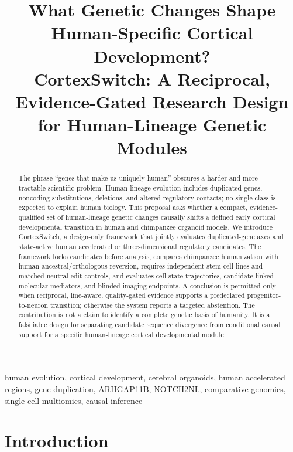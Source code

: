 \documentclass[conference]{IEEEtran}
\newcommand{\csw}{CortexSwitch}
\begin{document}
\title{What Genetic Changes Shape Human-Specific Cortical Development?\\
\csw: A Reciprocal, Evidence-Gated Research Design for Human-Lineage Genetic Modules}

\author{}
\maketitle

\begin{abstract}
The phrase ``genes that make us uniquely human'' obscures a harder and more tractable scientific problem. Human-lineage evolution includes duplicated genes, noncoding substitutions, deletions, and altered regulatory contacts; no single class is expected to explain human biology. This proposal asks whether a compact, evidence-qualified set of human-lineage genetic changes causally shifts a defined early cortical developmental transition in human and chimpanzee organoid models. We introduce CortexSwitch, a design-only framework that jointly evaluates duplicated-gene axes and state-active human accelerated or three-dimensional regulatory candidates. The framework locks candidates before analysis, compares chimpanzee humanization with human ancestral/orthologous reversion, requires independent stem-cell lines and matched neutral-edit controls, and evaluates cell-state trajectories, candidate-linked molecular mediators, and blinded imaging endpoints. A conclusion is permitted only when reciprocal, line-aware, quality-gated evidence supports a predeclared progenitor-to-neuron transition; otherwise the system reports a targeted abstention. The contribution is not a claim to identify a complete genetic basis of humanity. It is a falsifiable design for separating candidate sequence divergence from conditional causal support for a specific human-lineage cortical developmental module.
\end{abstract}

\begin{IEEEkeywords}
human evolution, cortical development, cerebral organoids, human accelerated regions, gene duplication, ARHGAP11B, NOTCH2NL, comparative genomics, single-cell multiomics, causal inference
\end{IEEEkeywords}

\section{Introduction}
\end{document}
